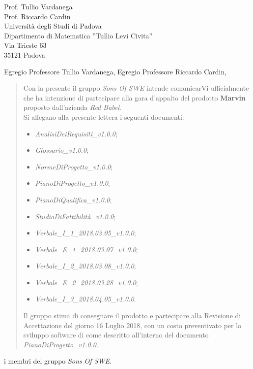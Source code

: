 \documentclass{letter}
\newcommand{\gruppo}{\emph{Sons Of SWE}}
\newcommand{\AdR}{\emph{AnalisiDeiRequisiti\_v1.0.0}}
\newcommand{\SdF}{\emph{StudioDiFattibilità\_v1.0.0}}
\newcommand{\NdP}{\emph{NormeDiProgetto\_v1.0.0}}
\newcommand{\PdP}{\emph{PianoDiProgetto\_v1.0.0}}
\newcommand{\PdQ}{\emph{PianoDiQualifica\_v1.0.0}}
\newcommand{\G}{\emph{Glossario\_v1.0.0}}
\newcommand{\VIuno}{\emph{Verbale\_I\_1\_2018.03.05\_v1.0.0}}
\newcommand{\VEuno}{\emph{Verbale\_E\_1\_2018.03.07\_v1.0.0}}
\newcommand{\VIdue}{\emph{Verbale\_I\_2\_2018.03.08\_v1.0.0}}
\newcommand{\VEdue}{\emph{Verbale\_E\_2\_2018.03.28\_v1.0.0}}
\newcommand{\VItre}{\emph{Verbale\_I\_3\_2018.04.05\_v1.0.0}}
\begin{document}
	
\begin{letter} {   
	\hfill Prof. Tullio Vardanega\\
	\hfill Prof. Riccardo Cardin\\
	\hfill Università degli Studi di Padova \\
	\hfill Dipartimento di Matematica ''Tullio Levi Civita'' \\
	\hfill Via Trieste 63 \\
	\hfill 35121 Padova \\
}

\date{}
\opening{Egregio Professore Tullio Vardanega, \newline Egregio Professore Riccardo Cardin,}
	\begin{quotation}
		\noindent Con la presente il gruppo \textit{\gruppo} intende comunicarVi ufficialmente che ha intenzione di partecipare alla gara d'appalto del prodotto \textbf{Marvin} proposto dall'azienda \textit{Red Babel}.\\
		Si allegano alla presente lettera i seguenti documenti:
		\begin{itemize}
			\item \AdR{};
			\item \G{};
			\item \NdP{};
			\item \PdP{};
			\item \PdQ{};
			\item \SdF{};
			\item \VIuno{};
			\item \VEuno{};
			\item \VIdue{};
			\item \VEdue{};
			\item \VItre{}.
		\end{itemize}
		Il gruppo stima di consegnare il prodotto e partecipare alla Revisione di Accettazione del giorno 16 Luglio 2018, con un costo preventivato per lo sviluppo software di  come descritto all’interno del documento \PdP{}.
	\end{quotation}
{
	\setlength\parindent{24pt}
	\indent i membri del gruppo \gruppo.
}
\end{letter}
\end{document}
